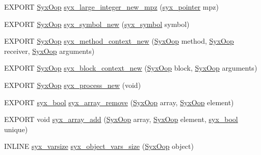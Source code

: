 \begin{CompactItemize}
\item 
EXPORT \hyperlink{syx-types_8h_1121caba2d40b2ce090b640762744ccd}{SyxOop} \hyperlink{syx-object_8h_68aa419b497b02410024a4fd26cac062}{syx\_\-large\_\-integer\_\-new\_\-mpz} (\hyperlink{syx-types_8h_51c518ab1f082eb4330ca143afb1584f}{syx\_\-pointer} mpz)
\item 
EXPORT \hyperlink{syx-types_8h_1121caba2d40b2ce090b640762744ccd}{SyxOop} \hyperlink{syx-object_8h_66d94b213daa6f81d344a80f6449c0ea}{syx\_\-symbol\_\-new} (\hyperlink{syx-types_8h_9663af54b7b72f5d8be5f754ef356525}{syx\_\-symbol} symbol)
\item 
EXPORT \hyperlink{syx-types_8h_1121caba2d40b2ce090b640762744ccd}{SyxOop} \hyperlink{syx-object_8h_ff5c03485bac91b5a79c29a2a6b98dd7}{syx\_\-method\_\-context\_\-new} (\hyperlink{syx-types_8h_1121caba2d40b2ce090b640762744ccd}{SyxOop} method, \hyperlink{syx-types_8h_1121caba2d40b2ce090b640762744ccd}{SyxOop} receiver, \hyperlink{syx-types_8h_1121caba2d40b2ce090b640762744ccd}{SyxOop} arguments)
\item 
EXPORT \hyperlink{syx-types_8h_1121caba2d40b2ce090b640762744ccd}{SyxOop} \hyperlink{syx-object_8h_e8dbdd7232dd6da7e16ad59ac26c0cbe}{syx\_\-block\_\-context\_\-new} (\hyperlink{syx-types_8h_1121caba2d40b2ce090b640762744ccd}{SyxOop} block, \hyperlink{syx-types_8h_1121caba2d40b2ce090b640762744ccd}{SyxOop} arguments)
\item 
EXPORT \hyperlink{syx-types_8h_1121caba2d40b2ce090b640762744ccd}{SyxOop} \hyperlink{syx-object_8h_cc28dff1a70eeea85e52a5501eda6b53}{syx\_\-process\_\-new} (void)
\item 
EXPORT \hyperlink{syx-types_8h_c6dc09b276b99fa1956364359139daab}{syx\_\-bool} \hyperlink{syx-object_8h_84e829e1cfb191f82e954d90787f1722}{syx\_\-array\_\-remove} (\hyperlink{syx-types_8h_1121caba2d40b2ce090b640762744ccd}{SyxOop} array, \hyperlink{syx-types_8h_1121caba2d40b2ce090b640762744ccd}{SyxOop} element)
\item 
EXPORT void \hyperlink{syx-object_8h_b322ffdd7c235f42e9bd992a6013c680}{syx\_\-array\_\-add} (\hyperlink{syx-types_8h_1121caba2d40b2ce090b640762744ccd}{SyxOop} array, \hyperlink{syx-types_8h_1121caba2d40b2ce090b640762744ccd}{SyxOop} element, \hyperlink{syx-types_8h_c6dc09b276b99fa1956364359139daab}{syx\_\-bool} unique)
\item 
INLINE \hyperlink{syx-types_8h_18e1a1417591a1efb670b97ce320f535}{syx\_\-varsize} \hyperlink{syx-object_8h_27fd8dfc7c2abc0d3e279624a676202b}{syx\_\-object\_\-vars\_\-size} (\hyperlink{syx-types_8h_1121caba2d40b2ce090b640762744ccd}{SyxOop} object)

\end{CompactItemize}
